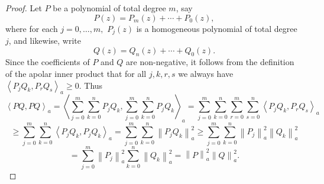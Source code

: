 \documentclass[10pt,a4paper]{amsart}
\begin{document}
\begin{proof} Let $P$ be a polynomial of total degree $m$, say 
\begin{equation*}
P\left( z \right) =P_{m}\left( z \right) +\cdots +P_{0}\left( z \right),
\end{equation*}
where for each $j=0, \dots ,m,$
 $P_{j}\left( z\right) $ is a homogeneous polynomial
of total degree $j$, and likewise, write
\begin{equation*}
Q\left( z \right) = Q_{n} \left( z \right) +\cdots +Q_{0}\left( z \right).
\end{equation*}
Since the coefficients of $P$ and $Q$ are non-negative, it follows from the definition of the apolar inner product that for all $j,k,r,s$ we always have $\left\langle  P_j Q_k, P_r Q_s\right\rangle_{a} \ge 0$. Thus 
\begin{equation}
\left\langle P Q, P Q\right\rangle_{a} 
=
\left\langle \sum_{j=0}^m
\sum_{k = 0}^{n} P_j Q_k, \sum_{j=0}^m \sum_{k = 0}^{n} P_j Q_k\right\rangle_{a} 
=
\sum_{j=0}^m \sum_{k = 0}^{n} \sum_{r=0}^m
\sum_{s = 0}^{n} \left\langle  P_j Q_k, P_r Q_s\right\rangle_{a} 
\end{equation}
\begin{equation}
\ge
\sum_{j=0}^m \sum_{k = 0}^{n}  \left\langle  P_j Q_k, P_j Q_k\right\rangle_{a} 
=
\sum_{j=0}^m \sum_{k = 0}^{n}  \left\| P_j Q_k\right\|_{a}^2
\ge
\sum_{j=0}^m \sum_{k = 0}^{n}  \left\| P_j \right\|_{a}^2 \left\|Q_k\right\|_{a}^2
\end{equation}
\begin{equation}
=
\sum_{j=0}^m   \left\| P_j \right\|_{a}^2 \sum_{k = 0}^{n} \left\|Q_k\right\|_{a}^2
= 
\left\| P \right\|_{a}^2 \left\| Q \right\|_{a}^2.
\end{equation}
\end{proof}
\end{document}

